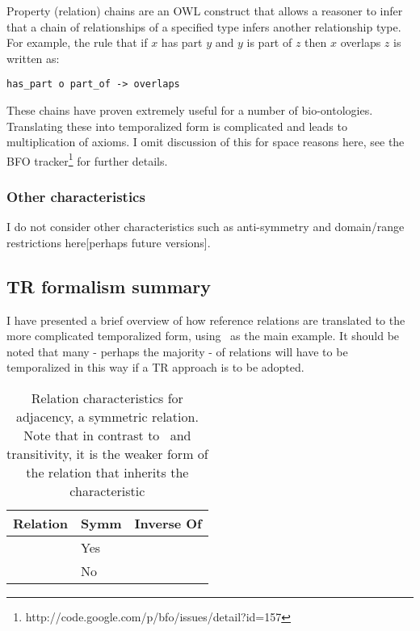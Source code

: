 \documentclass{bioinfo}
\def\partOf{\pr{part\_of}}
\def\adjacentTo{\pr{adjacent\_to}}
\def\atAllTimes{\pr{at-all-times}}
\def\atSomeTimes{\pr{at-some-times}}
\begin{document}
Property (relation) chains are an OWL construct that allows a reasoner
to infer that a chain of relationships of a specified type infers
another relationship type. For example, the rule that if $x$ has part
$y$ and $y$ is part of $z$ then $x$ overlaps $z$ is written as:

\begin{verbatim}
has_part o part_of -> overlaps
\end{verbatim}

These chains have proven extremely useful for a number of
bio-ontologies. Translating these into temporalized form is
complicated and leads to multiplication of axioms. I omit discussion
of this for space reasons here, see the BFO
tracker\footnote{http://code.google.com/p/bfo/issues/detail?id=157}
for further details.

\subsubsection{Other characteristics}

I do not consider other characteristics such as anti-symmetry and
domain/range restrictions here[perhaps future versions].

\subsection{TR formalism summary}

I have presented a brief overview of how reference relations are
translated to the more complicated temporalized form, using \partOf\
as the main example. It should be noted that many - perhaps the
majority - of relations will have to be temporalized in this way if a
TR approach is to be adopted. 

\begin{table}
\begin{tabular}{ | p{3cm} | p{1cm} | p{4cm} | }
\hline
\textbf{Relation} & \textbf{Symm} & \textbf{Inverse Of}  \\
\hline
\adjacentTo\ \atSomeTimes & Yes & \adjacentTo\ \atSomeTimes \\
\hline
\adjacentTo\ \atAllTimes & No & \\
\hline
\end{tabular}
\caption{Relation characteristics for adjacency, a symmetric
  relation. Note that in contrast to \partOf\ and transitivity, it is
  the weaker form of the relation that inherits the characteristic}
\label{tab:characteristics-adj}
\end{table}
\end{document}
